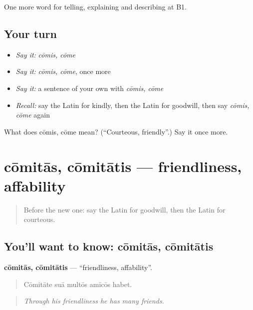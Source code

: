 \begin{grammarlens}[title={What you've built}]
One more word for telling, explaining and describing at B1.
\end{grammarlens}

\subsection*{Your turn}
\begin{itemize}
\raggedright
  \item \emph{Say it:} \emph{cōmis, cōme}
  \item \emph{Say it:} \emph{cōmis, cōme}, once more
  \item \emph{Say it:} a sentence of your own with \emph{cōmis, cōme}
  \item \emph{Recall:} say the Latin for kindly, then the Latin for goodwill, then say \emph{cōmis, cōme} again
\end{itemize}

\begin{tcolorbox}[breakable,colback=teal!4,colframe=teal!35!black,title={Before you move on}]
What does cōmis, cōme mean? (\textquotedblleft{}Courteous, friendly\textquotedblright{}.) Say it once more.
\end{tcolorbox}
\section[cōmitās, cōmitātis]{cōmitās, cōmitātis — friendliness, affability}

\label{lesson:LA-C506-comitas}



\begin{quote}
Before the new one: say the Latin for goodwill, then the Latin for courteous.
\end{quote}

\subsection*{You'll want to know: cōmitās, cōmitātis}
\textbf{cōmitās, cōmitātis} — \textquotedblleft{}friendliness, affability\textquotedblright{}.

\begin{quote}
Cōmitāte suā multōs amīcōs habet.
\end{quote}

\begin{quote}
\emph{Through his friendliness he has many friends.}
\end{quote}

